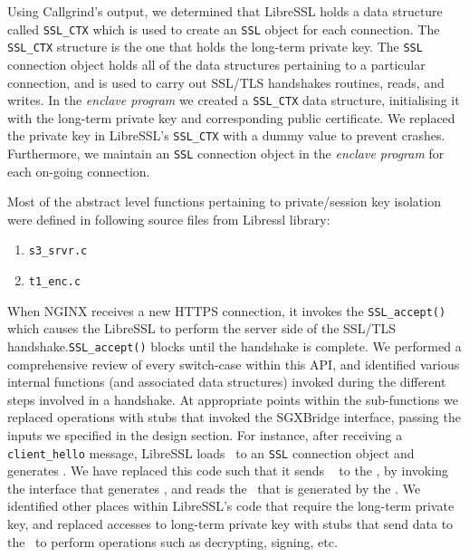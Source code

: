 \documentclass[../main.tex]{subfiles}
\begin{document}
Using Callgrind's output, we determined that LibreSSL holds a data
structure called \texttt{SSL\_CTX} which is used to create an
\texttt{SSL} object for each connection. The \texttt{SSL_CTX}
structure is the one that holds the long-term private key. The
\texttt{SSL} connection object holds all of the data structures
pertaining to a particular connection, and is used to carry out
SSL/TLS handshakes routines, reads, and writes. In the \textit{enclave
  program} we created a \texttt{SSL\_CTX} data structure, initialising
it with the long-term private key and corresponding public
certificate. We replaced the private key in LibreSSL's
\texttt{SSL_CTX} with a dummy value to prevent crashes. Furthermore,
we maintain an \texttt{SSL} connection object in the \textit{enclave
  program} for each on-going connection.
 
Most of the abstract level functions pertaining to private/session key
isolation were defined in following source files from Libressl
library:
\begin{enumerate}
  \item \texttt{s3\_srvr.c}
  \item \texttt{t1\_enc.c}
\end{enumerate}
 
When NGINX receives a new HTTPS connection, it invokes the
\texttt{SSL\_accept()} which causes the LibreSSL to perform the server
side of the SSL/TLS handshake.\texttt{SSL_accept()} blocks until the
handshake is complete. We performed a comprehensive review of every
switch-case within this API, and identified various internal functions
(and associated data structures) invoked during the different steps
involved in a handshake. At appropriate points within the
sub-functions we replaced operations with stubs that invoked the
SGXBridge interface, passing the inputs we specified in the design
section. For instance, after receiving a \texttt{client\_hello}
message, LibreSSL loads \crandom~to an \texttt{SSL} connection object
and generates \srandom. We have replaced this code such that it sends
\crandom~ to the \enclaveprogram, by invoking the interface that
generates \srandom, and reads the \srandom~that is generated by the
\enclaveprogram. We identified other places within LibreSSL's code
that require the long-term private key, and replaced accesses to
long-term private key with stubs that send data to the
\enclaveprogram~to perform operations such as decrypting, signing,
etc.
\end{document}
